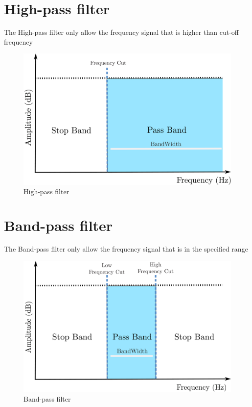 \section{High-pass filter}
\hspace{1.5cm}The High-pass filter only allow the frequency signal that is higher than cut-off frequency
\begin{figure}[ht]
	\centering
	\includegraphics[scale = 0.14]{chapter3/highpass.pdf}
	\caption{High-pass filter}
\end{figure}

\section{Band-pass filter}
\hspace{1.5cm}The Band-pass filter only allow the frequency signal that is in the specified range
\begin{figure}[ht]
	\centering
	\includegraphics[scale = 0.14]{chapter3/bandpass.pdf}
	\caption{Band-pass filter}
\end{figure}

